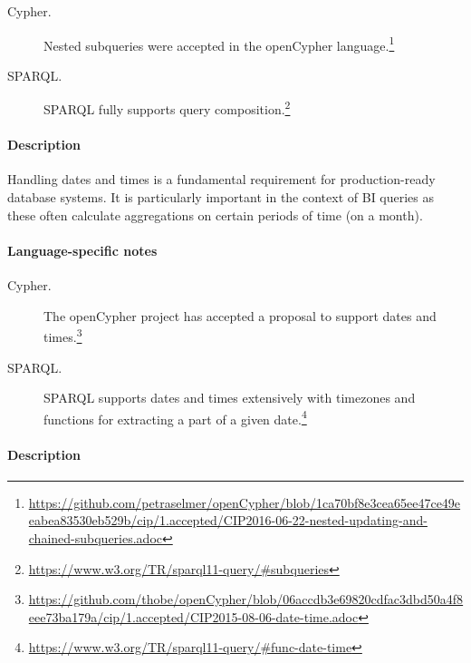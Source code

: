 \begin{description}
\item[Cypher.] Nested subqueries were accepted in the openCypher language.\footnote{\url{https://github.com/petraselmer/openCypher/blob/1ca70bf8e3cea65ee47ce49eeabea83530eb529b/cip/1.accepted/CIP2016-06-22-nested-updating-and-chained-subqueries.adoc}}
\item[SPARQL.] SPARQL fully supports query composition.\footnote{\url{https://www.w3.org/TR/sparql11-query/\#subqueries}}
\end{description}





\paragraph{Description}

Handling dates and times is a fundamental requirement for production-ready
database systems. It is particularly important in the context of BI queries as
these often calculate aggregations on certain periods of time (\eg on a month).

\paragraph{Language-specific notes}

\begin{description}
\item[Cypher.] The openCypher project has accepted a proposal to support dates and times.\footnote{\url{https://github.com/thobe/openCypher/blob/06accdb3e69820cdfac3dbd50a4f8eee73ba179a/cip/1.accepted/CIP2015-08-06-date-time.adoc}}

\item[SPARQL.] SPARQL supports dates and times extensively with timezones and functions for extracting a part of a given date.\footnote{\url{https://www.w3.org/TR/sparql11-query/\#func-date-time}}
\end{description}





\paragraph{Description}

